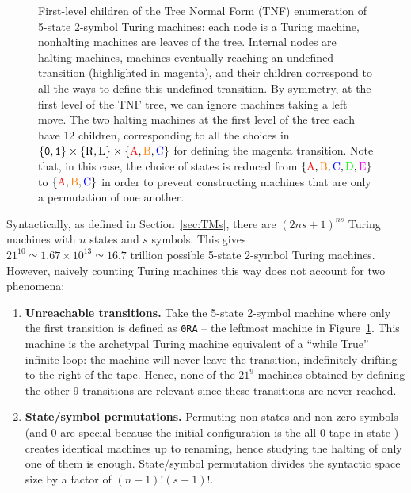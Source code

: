 \begin{figure}[ht]
{\begin{tikzpicture}
        \end{tikzpicture}
    }
    \caption{First-level children of the Tree Normal Form (TNF) enumeration of 5-state 2-symbol Turing machines: each node is a Turing machine, nonhalting machines are leaves of the tree. Internal nodes are halting machines, \ie machines eventually reaching an undefined transition (highlighted in magenta), and their children correspond to all the ways to define this undefined transition. By symmetry, at the first level of the TNF tree, we can ignore machines taking a left move. The two halting machines at the first level of the tree each have 12 children, corresponding to all the choices in $\{\szero,\sone\}\times\{\text{R},\text{L}\}\times\{\text{\stateA},\text{\stateB},\text{\stateC}\}$ for defining the magenta transition. Note that, in this case, the choice of states is reduced from $\{\text{\stateA},\text{\stateB},\text{\stateC},\text{\stateD},\text{\stateE}\}$ to $\{\text{\stateA},\text{\stateB},\text{\stateC}\}$ in order to prevent constructing machines that are only a permutation of one another.}\label{fig:TNF}
\end{figure}



Syntactically, as defined in Section~\ref{sec:TMs}, there are $(2ns + 1)^{ns}$ Turing machines with $n$ states and $s$ symbols. This gives $21^{10} \simeq 1.67\times10^{13} \simeq 16.7 \text{ trillion}$ possible 5-state 2-symbol Turing machines. However, naively counting Turing machines this way does not account for two phenomena:
\begin{enumerate}
    \item \textbf{Unreachable transitions.} Take the 5-state 2-symbol machine where only the first transition is defined as \texttt{0RA} -- the leftmost machine in Figure~\ref{fig:TNF}. This machine is the archetypal Turing machine equivalent of a ``while True'' infinite loop: the machine will never leave the transition, indefinitely drifting to the right of the tape. Hence, none of the $21^9$ machines obtained by defining the other 9 transitions are relevant since these transitions are never reached.
    \item \textbf{State/symbol permutations.} Permuting non-\stateA states and non-zero symbols (\stateA and 0 are special because the initial configuration is the all-0 tape in state \stateA) creates identical machines up to renaming, hence studying the halting of only one of them is enough. State/symbol permutation divides the syntactic space size by a factor of $(n-1)! (s-1)!$.
\end{enumerate}

